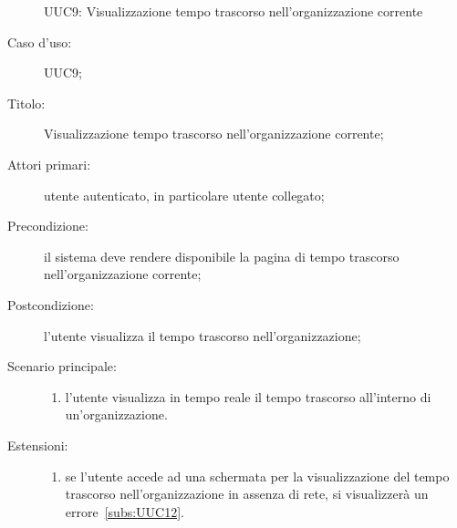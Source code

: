 \documentclass[../../../analisi-dei-requisiti.tex]{subfiles}
\begin{document}
\begin{figure}[H]
  \centering
  \caption{UUC9: Visualizzazione tempo trascorso nell'organizzazione corrente}%
  \label{fig:UUC9}
\end{figure}

\begin{description}
  \item[Caso d’uso:] UUC9;
  \item[Titolo:] Visualizzazione tempo trascorso nell'organizzazione corrente;
  \item[Attori primari:] utente autenticato, in particolare utente collegato;
  \item[Precondizione:] il sistema deve rendere disponibile la pagina di tempo trascorso nell'organizzazione corrente;
  \item[Postcondizione:] l'utente visualizza il tempo trascorso nell'organizzazione;
  \item[Scenario principale:]
        \begin{enumerate}
          \item l'utente visualizza in tempo reale il tempo trascorso all'interno di un'organizzazione.
        \end{enumerate}
  \item[Estensioni:]
        \begin{enumerate}
          \item se l'utente accede ad una schermata per la visualizzazione del tempo trascorso nell'organizzazione in assenza di rete, si visualizzerà un errore~\ref{subs:UUC12}.
        \end{enumerate}
\end{description}
\end{document}
